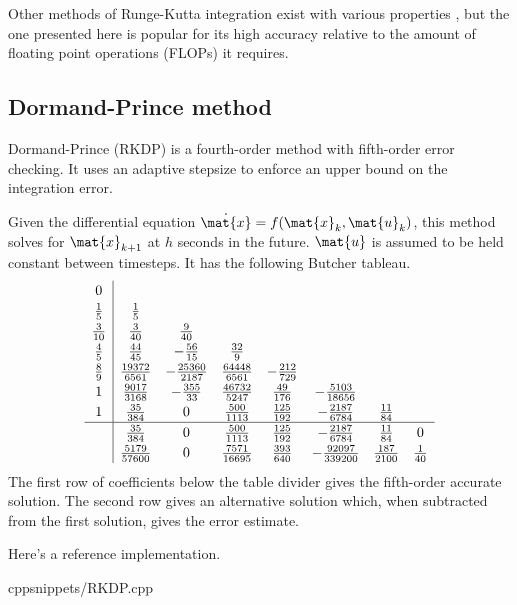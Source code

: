 Other methods of Runge-Kutta integration exist with various properties
\cite{bib:wiki_rk4}, but the one presented here is popular for its high accuracy
relative to the amount of floating point operations (FLOPs) it requires.

\subsection{Dormand-Prince method}

Dormand-Prince (RKDP) is a fourth-order method with fifth-order error checking.
It uses an adaptive stepsize to enforce an upper bound on the integration error.
\begin{theorem}
  \label{thm:rkdp}

  Given the differential equation $\dot{\mat{x}} = f(\mat{x}_k, \mat{u}_k)$,
  this method solves for $\mat{x}_{k+1}$ at $h$ seconds in the future.
  $\mat{u}$ is assumed to be held constant between timesteps. It has the
  following Butcher tableau.
  \begin{equation*}
    \renewcommand\arraystretch{1.2}
    \begin{array}{c|ccccccc}
      0 \\
      \frac{1}{5} & \frac{1}{5} \\
      \frac{3}{10} & \frac{3}{40} & \frac{9}{40} \\
      \frac{4}{5} & \frac{44}{45} & -\frac{56}{15} & \frac{32}{9} \\
      \frac{8}{9} & \frac{19372}{6561} & -\frac{25360}{2187} &
        \frac{64448}{6561} & -\frac{212}{729} \\
      1 & \frac{9017}{3168} & -\frac{355}{33} & \frac{46732}{5247} &
        \frac{49}{176} & -\frac{5103}{18656} \\
      1 & \frac{35}{384} & 0 & \frac{500}{1113} & \frac{125}{192} &
        -\frac{2187}{6784} & \frac{11}{84} \\
      \hline
      & \frac{35}{384} & 0 & \frac{500}{1113} & \frac{125}{192} &
        -\frac{2187}{6784} & \frac{11}{84} & 0 \\
      & \frac{5179}{57600} & 0 & \frac{7571}{16695} & \frac{393}{640} &
        -\frac{92097}{339200} & \frac{187}{2100} & \frac{1}{40}
    \end{array}
  \end{equation*}
  The first row of coefficients below the table divider gives the fifth-order
  accurate solution. The second row gives an alternative solution which,
  when subtracted from the first solution, gives the error estimate.
\end{theorem}

Here's a reference implementation.
\begin{coderemote}{cpp}{snippets/RKDP.cpp}
  \caption{RKDP implementation in C++}
\end{coderemote}
